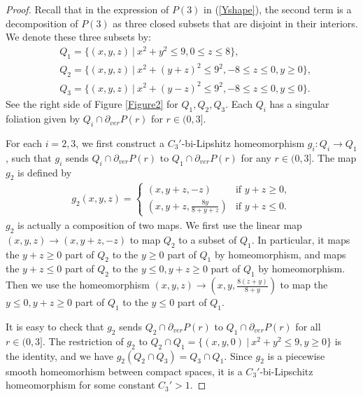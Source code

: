 \documentclass{amsart}
\begin{document}
\begin{proof}
Recall that in the expression of $P(3)$ in (\ref{Yshape}), the second term is a decomposition of $P(3)$ as three closed subsets that are disjoint in their interiors. We denote these three subsets by: 
\begin{equation*}
\begin{aligned}
& Q_1=\{(x,y,z)\ |\ x^2+y^2\leq 9, 0\leq z\leq 8\},\\
& Q_2=\{(x,y,z)\ |\ x^2+(y+z)^2\leq 9^2,-8\leq z\leq 0, y\geq 0\}, \\
& Q_3=\{(x,y,z)\ |\ x^2+(y-z)^2\leq 9^2,-8\leq z\leq 0, y\leq 0\}.
\end{aligned}
\end{equation*}
See the right side of Figure \ref{Figure2} for $Q_1, Q_2, Q_3$. Each $Q_i$ has a singular foliation given by $Q_i\cap \partial_{ver}P(r)$ for $r\in (0,3]$. 

For each $i=2,3$, we first construct a $C_3'$-bi-Lipshitz homeomorphism $g_i: Q_i\to Q_1$, such that $g_i$ sends $Q_i\cap \partial_{ver}P(r)$ to $Q_1\cap \partial_{ver}P(r)$ for any $r\in (0,3]$. The map $g_2$ is defined by 
\begin{equation*}
\begin{aligned}
g_2(x,y,z)=
\begin{cases}
(x,y+z,-z) & \text{if\ }y+z\geq 0,\\
(x,y+z,\frac{8y}{8+y+z}) & \text{if\ } y+z\leq 0.
\end{cases}
\end{aligned}
\end{equation*} 
$g_2$ is actually a composition of two maps. We first use the linear map $(x,y,z)\to (x,y+z,-z)$ to map $Q_2$ to a subset of $Q_1$. In particular, it maps the $y+z\geq 0$ part of $Q_2$ to the $y\geq 0$ part of $Q_1$ by homeomorphism, and maps the $y+z\leq 0$ part of $Q_2$ to the $y\leq 0, y+z\geq 0$ part of $Q_1$ by homeomorphism. Then we use the homeomorphism $(x,y,z)\to (x,y,\frac{8(z+y)}{8+y})$ to map the $y\leq 0, y+z\geq 0$ part of $Q_1$ to the $y\leq 0$ part of $Q_1$. 

It is easy to check that $g_2$ sends $Q_2\cap \partial_{ver}P(r)$ to  $Q_1\cap \partial_{ver}P(r)$ for all $r\in (0,3]$. The restriction of $g_2$ to $Q_2\cap Q_1=\{(x,y,0)\ |\ x^2+y^2\leq 9, y\geq 0\}$ is the identity, and we have $g_2(Q_2\cap Q_3)=Q_3\cap Q_1$. Since $g_2$ is a piecewise smooth homeomorhism between compact spaces, it is a $C_3'$-bi-Lipschitz homeomorphism for some constant $C_3'>1$. 


\end{proof}
\end{document}
